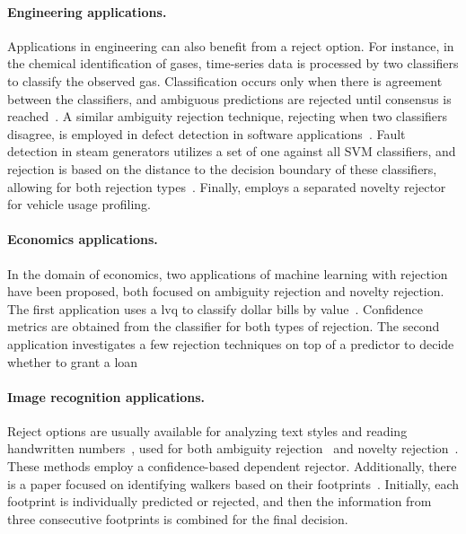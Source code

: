 \paragraph{Engineering applications.} 
Applications in engineering can also benefit from a reject option. For instance, in the chemical identification of gases, time-series data is processed by two classifiers to classify the observed gas. Classification occurs only when there is agreement between the classifiers, and ambiguous predictions are rejected until consensus is reached~\citep{Hatami2013}. A similar ambiguity rejection technique, rejecting when two classifiers disagree, is employed in defect detection in software applications~\citep{Mesquita2016}. Fault detection in steam generators utilizes a set of one against all SVM classifiers, and rejection is based on the distance to the decision boundary of these classifiers, allowing for both rejection types~\citep{Zou2011}. Finally, \cite{Hendrickx2022} employs a separated novelty rejector for vehicle usage profiling.

\paragraph{Economics applications.} In the domain of economics, two applications of machine learning with rejection have been proposed, both focused on ambiguity rejection and novelty rejection. The first application uses a \gls{lvq} to classify dollar bills by value~\citep{Ahmadi2004}. Confidence metrics are obtained from the classifier for both types of rejection. The second application investigates a few rejection techniques on top of a predictor to decide whether to grant a loan~\citep{Coenen2020}

\paragraph{Image recognition applications.} Reject options are usually available for analyzing text styles and reading handwritten numbers~\citep{Fumera2004}, used for both ambiguity rejection~\citep{Xu1992,Huang1995,RAHMAN1998} and novelty rejection~\citep{Lou1999c,Arlandis2002}. These methods employ a confidence-based dependent rejector. Additionally, there is a paper focused on identifying walkers based on their footprints~\citep{Suutala2004}. Initially, each footprint is individually predicted or rejected, and then the information from three consecutive footprints is combined for the final decision.